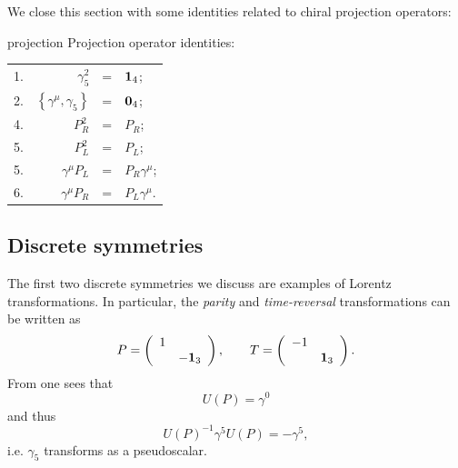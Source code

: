 We close this section with some identities related to chiral projection
operators:
\begin{proposition}{}{projection}
Projection operator identities:
\begin{center}\begin{tabular}{lrcl}
1. &$\gamma_5^2$ &=& ${\mathbf 1}_4$;\\
2. &$\left\{\gamma^\mu,\gamma_5\right\}$ &=& ${\mathbf 0}_4$;\\
4. & $P_R^2$ &=& $P_R$;\\
5. & $P_L^2$ &=& $P_L$;\\
5. & $\gamma^\mu P_L$ &=& $P_R \gamma^\mu$;\\
6. & $\gamma^\mu P_R$ &=& $P_L \gamma^\mu$.
\end{tabular}\end{center}
\end{proposition}


\subsection{Discrete symmetries}\label{sec:discreteSymm}

The first two discrete symmetries we discuss are examples of Lorentz
transformations. In particular, the {\it parity} and {\it
time-reversal} transformations can be written as
\begin{equation}
P=\left(\begin{array}{cc}
                 1  &   \\
                   & -{\mathbf 1}_3 
           \end{array}\right),~~~~~~
T=\left(\begin{array}{cc}
                 -1  &   \\
                   & {\mathbf 1}_3 
           \end{array}\right).
\end{equation} 
From  one sees that
\begin{equation}
U(P)=\gamma^0
\end{equation}
and thus
\begin{equation}
U(P)^{-1} \gamma^5 U(P)=-\gamma^5,
\end{equation}
i.e. $\gamma_5$ transforms as a pseudoscalar.

